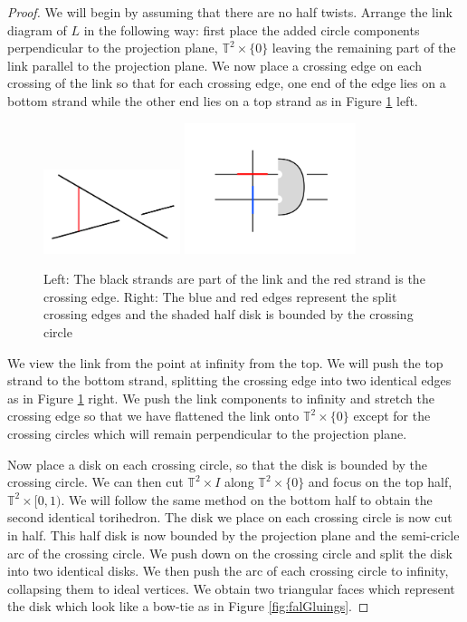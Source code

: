 \documentclass[11pt]{amsart}
\newcommand{\torus}{{\mathbb{T}^2}}
\theoremstyle{plain}
\theoremstyle{definition}
\begin{document}
\begin{proof}
We will begin by assuming that there are no half twists. 
Arrange the link diagram of $L$ in the following way: first place the added
circle components perpendicular to the projection plane, $\torus
\times \{0\}$ leaving the remaining part of the link parallel to the projection
plane.  We now place a crossing edge on each crossing of the link so that for
each crossing edge, one end of the edge lies on a bottom strand while the other
end lies on a top strand as in Figure \ref{fig:crossingArc} left.

\begin{figure} 
\centering 
\includegraphics[width=4cm]{crossingArc}
\includegraphics[width=5cm]{crossingPush} 
\caption{Left: The black strands are
part of the link and the red strand is the crossing edge. Right: The blue and
red edges represent the split crossing edges and the shaded half disk is bounded
by the crossing circle} 
\label{fig:crossingArc} 
\end{figure}

\indent We view the link from the point at infinity from the top. We will push
the top strand to the bottom strand, splitting the crossing edge into two
identical edges as in Figure \ref{fig:crossingArc} right. We push the link
components to infinity and stretch the crossing edge so that we have flattened
the link onto $\torus \times \{0\}$ except for the crossing circles which will
remain perpendicular to the projection plane. 
 
\indent Now place a disk on each crossing circle, so that the disk is bounded by
the crossing circle. We can then cut $\torus \times I$ along $\torus \times \{0\}$ and
focus on the top half, $\torus \times [0,1)$. We will follow the same method on the
bottom half to obtain the second identical torihedron. The disk we place on each
crossing circle is now cut in half. This half disk is now bounded by the
projection plane and the semi-cricle arc of the crossing circle. We push down on
the crossing circle and split the disk into two identical disks. We then push
the arc of each crossing circle to infinity, collapsing them to ideal vertices.
We obtain two triangular faces which represent the disk which look like a
bow-tie as in Figure \ref{fig:falGluings}. 


\end{proof}
\end{document}
